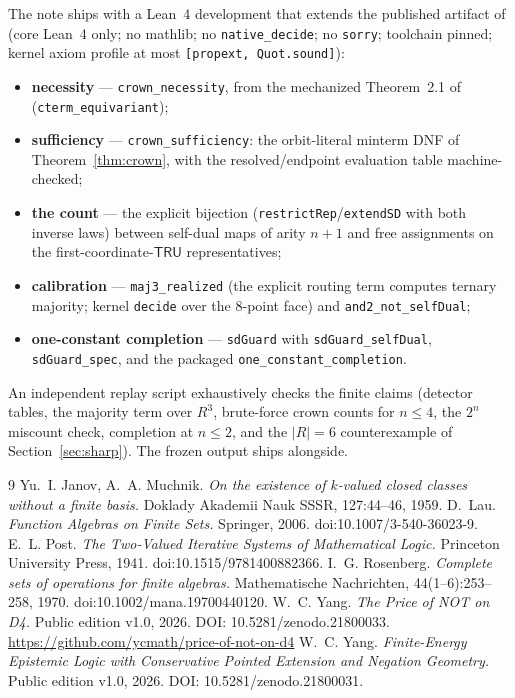 \documentclass[11pt]{article}
\theoremstyle{remark}
\newcommand{\TRU}{\ensuremath{\mathsf{TRU}}}
\begin{document}
The note ships with a Lean~4 development that extends the published
artifact of \cite{wcy2} (core Lean~4 only; no mathlib; no
\texttt{native\_decide}; no \texttt{sorry}; toolchain pinned; kernel
axiom profile at most \texttt{[propext, Quot.sound]}):
\begin{itemize}
\item \textbf{necessity} --- \texttt{crown\_necessity}, from the
  mechanized Theorem~2.1 of \cite{wcy2} (\texttt{cterm\_equivariant});
\item \textbf{sufficiency} --- \texttt{crown\_sufficiency}: the
  orbit-literal minterm DNF of Theorem~\ref{thm:crown}, with the
  resolved/endpoint evaluation table machine-checked;
\item \textbf{the count} --- the explicit bijection
  (\texttt{restrictRep}/\texttt{extendSD} with both inverse laws)
  between self-dual maps of arity $n{+}1$ and free assignments on the
  first-coordinate-\TRU{} representatives;
\item \textbf{calibration} --- \texttt{maj3\_realized} (the explicit
  routing term computes ternary majority; kernel \texttt{decide} over
  the 8-point face) and \texttt{and2\_not\_selfDual};
\item \textbf{one-constant completion} --- \texttt{sdGuard} with
  \texttt{sdGuard\_selfDual}, \texttt{sdGuard\_spec}, and the packaged
  \texttt{one\_constant\_completion}.
\end{itemize}
An independent replay script exhaustively checks the finite claims
(detector tables, the majority term over $R^3$, brute-force crown counts
for $n\le 4$, the $2^n$ miscount check, completion at $n\le 2$, and the
$|R|=6$ counterexample of Section~\ref{sec:sharp}). The frozen output
ships alongside.

\begin{thebibliography}{9}
 Yu.~I. Janov, A.~A. Muchnik. \emph{On the existence of
$k$-valued closed classes without a finite basis.} Doklady Akademii Nauk
SSSR, 127:44--46, 1959.
 D.~Lau. \emph{Function Algebras on Finite Sets.} Springer,
2006. doi:10.1007/3-540-36023-9.
 E.~L. Post. \emph{The Two-Valued Iterative Systems of
Mathematical Logic.} Princeton University Press, 1941.
doi:10.1515/9781400882366.
 I.~G. Rosenberg. \emph{Complete sets of operations
for finite algebras.} Mathematische Nachrichten, 44(1--6):253--258,
1970. doi:10.1002/mana.19700440120.
 W.~C. Yang. \emph{The Price of NOT on \textsf{D4}.}
Public edition v1.0, 2026. DOI: 10.5281/zenodo.21800033.
\url{https://github.com/ycmath/price-of-not-on-d4}
 W.~C. Yang. \emph{Finite-Energy Epistemic Logic with
Conservative Pointed Extension and Negation Geometry.} Public edition
v1.0, 2026. DOI: 10.5281/zenodo.21800031.
\end{thebibliography}
\end{document}

